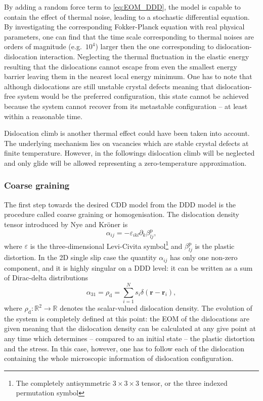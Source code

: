 By adding a random force term to \cref{eq:EOM_DDD}, the model is capable to contain the effect of thermal noise, leading to a stochastic differential equation. By investigating the corresponding Fokker-Planck equation with real physical parameters, one can find that the time scale corresponding to thermal noises are orders of magnitude (e.g.\ $10^4$) larger then the one corresponding to dislocation-dislocation interaction. Neglecting the thermal fluctuation in the elastic energy resulting that the dislocations cannot escape from even the smallest energy barrier leaving them in the nearest local energy minimum. One has to note that although dislocations are still unstable crystal defects meaning that dislocation-free system would be the preferred configuration, this state cannot be achieved because the system cannot recover from its metastable configuration -- at least within a reasonable time.

Dislocation climb is another thermal effect could have been taken into account. The underlying mechanism lies on vacancies which are stable crystal defects at finite temperature. However, in the followings dislocation climb will be neglected and only glide will be allowed representing a zero-temperature approximation.

\subsubsection{Coarse graining}
The first step towards the desired CDD model from the DDD model is the procedure called coarse graining or homogenisation. The dislocation density tensor introduced by Nye and Kröner is
\begin{equation}
{\alpha _{ij}} =  - {\varepsilon _{ikl}}{\partial _k}\beta _{lj}^{\text{p}},
\end{equation}
where 
$\varepsilon $ is the three-dimensional Levi-Civita symbol\footnote{The completely antisymmetric $3 \times 3 \times 3$ tensor, or the three indexed permutation symbol} and $\beta _{lj}^{\text{p}}$ is the plastic distortion. In the 2D single slip case the quantity ${\alpha _{ij}}$ has only one non-zero component, and it is highly singular on a DDD level: it can be written as a sum of Dirac-delta distributions
\begin{equation} \label{eq:alpha_is_sum_of_dirac_delta}
{\alpha _{31}} = {\rho _{\text{d}}} = \sum\limits_{i = 1}^N {{s_i}\delta \left({{\mathbf{r}} - {{\mathbf{r}}_i}} \right)},
\end{equation}
where ${\rho _{\text{d}}}:{\mathbb{R}^2} \to \mathbb{R}$ denotes the scalar-valued dislocation density. The evolution of the system is completely defined at this point: the EOM of the dislocations are given meaning that the dislocation density can be calculated at any give point at any time which determines -- compared to an initial state -- the plastic distortion and the stress. In this case, however, one has to follow each of the dislocation containing the whole microscopic information of dislocation configuration.

